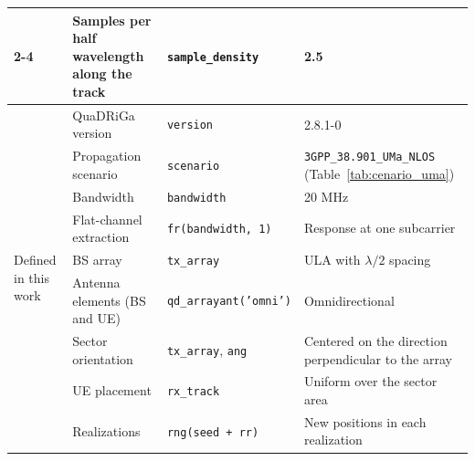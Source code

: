 \begin{table}[!ht]
\begin{tabular}{|p{2.7cm}|p{3.2cm}|p{4.2cm}|p{3.1cm}|}
\cline{2-4}
 & \raggedright Samples per half wavelength along the track & \raggedright \texttt{sample\_\allowbreak{}density} & \raggedright 2.5 \tabularnewline
\midrule
\multirow{9}{=}{\raggedright Defined in this work} & \raggedright QuaDRiGa version & \raggedright \texttt{version} & \raggedright 2.8.1-0 \tabularnewline
\cline{2-4}
 & \raggedright Propagation scenario & \raggedright \texttt{scenario} & \raggedright \texttt{3GPP\_\allowbreak{}38.901\_\allowbreak{}UMa\_\allowbreak{}NLOS} (Table~\ref{tab:cenario_uma}) \tabularnewline
\cline{2-4}
 & \raggedright Bandwidth & \raggedright \texttt{bandwidth} & \raggedright 20 MHz \tabularnewline
\cline{2-4}
 & \raggedright Flat-channel extraction & \raggedright \texttt{fr(bandwidth, 1)} & \raggedright Response at one subcarrier \tabularnewline
\cline{2-4}
 & \raggedright BS array & \raggedright \texttt{tx\_\allowbreak{}array} & \raggedright ULA with $\lambda/2$ spacing \tabularnewline
\cline{2-4}
 & \raggedright Antenna elements (BS and UE) & \raggedright \texttt{qd\_\allowbreak{}arrayant('omni')} & \raggedright Omnidirectional \tabularnewline
\cline{2-4}
 & \raggedright Sector orientation & \raggedright \texttt{tx\_\allowbreak{}array}, \texttt{ang} & \raggedright Centered on the direction perpendicular to the array \tabularnewline
\cline{2-4}
 & \raggedright UE placement & \raggedright \texttt{rx\_\allowbreak{}track} & \raggedright Uniform over the sector area \tabularnewline
\cline{2-4}
 & \raggedright Realizations & \raggedright \texttt{rng(seed + rr)} & \raggedright New positions in each realization \tabularnewline
\bottomrule
\end{tabular}
\vspace{4pt}
\end{table}

